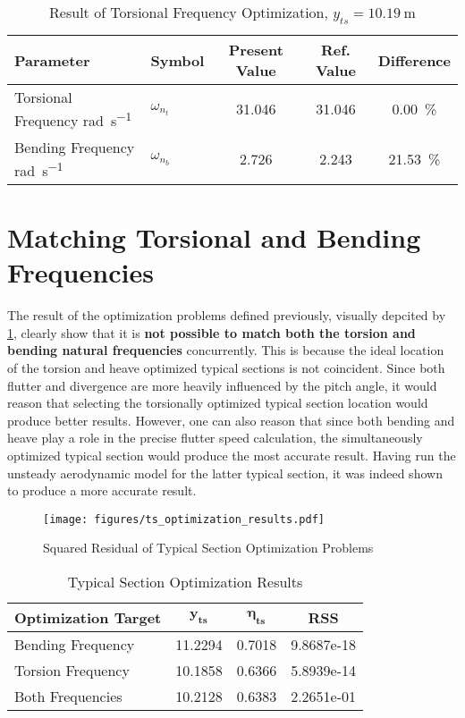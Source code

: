 \begin{table}[H]
    \centering
    \caption{Result of Torsional Frequency Optimization, $y_{ts} =
    \SI{10.19}{\meter}$}
    \label{tab:torsion_frequencies}
    \begin{tabularx}{\textwidth}{p{}P{0.095\textwidth}CCC}
    \toprule
    \textbf{Parameter} & \textbf{Symbol} &\textbf{Present Value}
    &\textbf{Ref. Value \autocite{howcroftEfficientAeroelasticBeam2019}}
    & \textbf{Difference} \\
    \midrule
    Torsional Frequency \si{\radian\per\second}
    & $\omega_{n_t}$ & 31.046 & 31.046 & \SI{0.00}{\percent}\\
    Bending Frequency \si{\radian\per\second}
    & $\omega_{n_b}$ & 2.726 & 2.243 & \SI{21.53}{\percent}\\ \bottomrule
    \end{tabularx}
\end{table}

\section{Matching Torsional and Bending Frequencies}
The result of the optimization problems defined previously, visually depcited
by \cref{fig:ts_optimization}, clearly show that it is \textbf{not possible to
match both the torsion and bending natural frequencies} concurrently. This is
because the ideal location of the torsion and heave optimized typical sections
is not coincident. Since both flutter and divergence are more heavily
influenced by the pitch angle, it would reason that selecting the torsionally
optimized typical section location would produce better results. However, one
can also reason that since both bending and heave play a role in the precise
flutter speed calculation, the simultaneously optimized typical section would
produce the most accurate result. Having run the unsteady aerodynamic model for
the latter typical section, it was indeed shown to produce a more accurate
result.

\begin{figure}[H]
    \centering
    \texttt{[image: figures/ts\_optimization\_results.pdf]}
    \caption{Squared Residual of Typical Section Optimization Problems}
    \label{fig:ts_optimization}
\end{figure}

\begin{table}[H]
    \centering
    \caption{Typical Section Optimization Results}
    \label{tab:ts_opt_residuals}
    \begin{tabularx}{\textwidth}{p{}CCC}
    \toprule
    \textbf{Optimization Target} & $\bm{y_{ts}}$ & $\bm{\eta_{ts}}$ & \textbf{RSS} \\
    \midrule
    Bending Frequency & 11.2294 & 0.7018 & 9.8687e-18 \\
    Torsion Frequency & 10.1858 & 0.6366 & 5.8939e-14 \\
    Both Frequencies & 10.2128 & 0.6383 & 2.2651e-01 \\ \bottomrule
    \end{tabularx}
\end{table}

